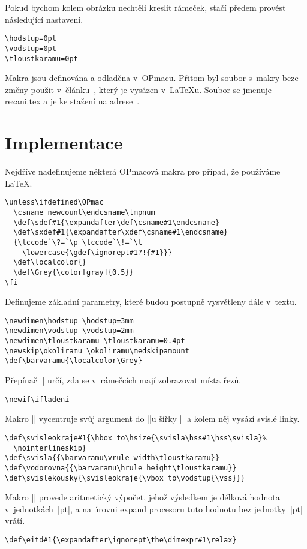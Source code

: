 \documentclass[oldcsbabel]{csbulletin}
\def\p#1{\texttt{\char`\\#1}}
\def\soub#1{{\sf#1}}
\def\barvaramu{\color[cmyk]{0,0,0,0.4}}
\begin{document}
Pokud bychom kolem obrázku nechtěli kreslit rámeček, stačí předem provést následující nastavení.
\begin{Verbatim}[numbers=none]
\hodstup=0pt
\vodstup=0pt
\tloustkaramu=0pt
\end{Verbatim}

Makra jsou definována a odladěna v~OPmacu. Přitom byl soubor s~makry beze změny použit v~článku~\cite{literate}, který je vysázen v~\LaTeX u. Soubor se jmenuje \soub{rezani.tex} a je ke stažení na adrese~\cite{rezaniweb}.


\section{Implementace}
\label{S81}

Nejdříve nadefinujeme některá OPmacová makra pro případ, že používáme \LaTeX.

\begin{Verbatim}[firstnumber=auto]
\unless\ifdefined\OPmac
  \csname newcount\endcsname\tmpnum
  \def\sdef#1{\expandafter\def\csname#1\endcsname}
  \def\sxdef#1{\expandafter\xdef\csname#1\endcsname}
  {\lccode`\?=`\p \lccode`\!=`\t
    \lowercase{\gdef\ignorept#1?!{#1}}}
  \def\localcolor{}
  \def\Grey{\color[gray]{0.5}}
\fi
\end{Verbatim}

Definujeme základní parametry, které budou postupně vysvětleny dále v~textu.
\begin{Verbatim}
\newdimen\hodstup \hodstup=3mm
\newdimen\vodstup \vodstup=2mm
\newdimen\tloustkaramu \tloustkaramu=0.4pt
\newskip\okoliramu \okoliramu\medskipamount
\def\barvaramu{\localcolor\Grey}
\end{Verbatim}

Přepínač |\ifladeni| určí, zda se v~rámečcích mají zobrazovat místa řezů.
\begin{Verbatim}
\newif\ifladeni
\end{Verbatim}

Makro |\svisleokraje| vycentruje svůj argument do |\hbox|u šířky |\hsize| a kolem něj vysází svislé linky.
\begin{Verbatim}
\def\svisleokraje#1{\hbox to\hsize{\svisla\hss#1\hss\svisla}%
  \nointerlineskip}
\def\svisla{{\barvaramu\vrule width\tloustkaramu}}
\def\vodorovna{{\barvaramu\hrule height\tloustkaramu}}
\def\svislekousky{\svisleokraje{\vbox to\vodstup{\vss}}}
\end{Verbatim}

Makro |\eitd| provede aritmetický výpočet, jehož výsledkem je délková hodnota v~jednotkách~|pt|, a na úrovni expand procesoru tuto hodnotu bez jednotky~|pt| vrátí.
\begin{Verbatim}
\def\eitd#1{\expandafter\ignorept\the\dimexpr#1\relax}
\end{Verbatim}
\end{document}
